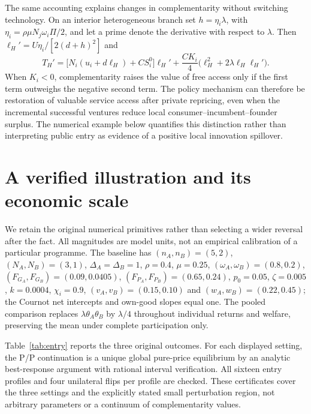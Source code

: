 \documentclass[11pt]{article}
\begin{document}
The same accounting explains changes in complementarity without switching technology.
On an interior heterogeneous branch set $h=\eta_i\lambda$, with $\eta_i=\rho\mu N_j\omega_i\Pi/2$, and let a prime denote the derivative with respect to $\lambda$.
Then $\ell_H'=U\eta_i/[2(d+h)^2]$ and
\begin{equation}
 T_H'=\big[N_i(u_i+d\ell_H)+CS_i^0\big]\ell_H'
       +\frac{CK_i}{4}\big(\ell_H^2+2\lambda\ell_H\ell_H'\big).
 \label{eq:diagnostic-derivative}
\end{equation}
When $K_i<0$, complementarity raises the value of free access only if the first term outweighs the negative second term.
The policy mechanism can therefore be restoration of valuable service access after private repricing, even when the incremental successful ventures reduce local consumer--incumbent--founder surplus.
The numerical example below quantifies this distinction rather than interpreting public entry as evidence of a positive local innovation spillover.

\section{A verified illustration and its economic scale}\label{sec:numerical}

We retain the original numerical primitives rather than selecting a wider reversal after the fact.
All magnitudes are model units, not an empirical calibration of a particular programme.
The baseline has $(n_A,n_B)=(5,2)$, $(N_A,N_B)=(3,1)$, $\Delta_A=\Delta_B=1$, $\rho=0.4$, $\mu=0.25$, $(\omega_A,\omega_B)=(0.8,0.2)$, $(F_{G_A},F_{G_B})=(0.09,0.0405)$, $(F_{P_A},F_{P_B})=(0.65,0.24)$, $p_0=0.05$, $\zeta=0.005$, $k=0.0004$, $\chi_i=0.9$, $(v_A,v_B)=(0.15,0.10)$ and $(w_A,w_B)=(0.22,0.45)$; the Cournot net intercepts and own-good slopes equal one.
The pooled comparison replaces $\lambda\theta_A\theta_B$ by $\lambda/4$ throughout individual returns and welfare, preserving the mean under complete participation only.

Table~\ref{tab:entry} reports the three original outcomes.
For each displayed setting, the P/P continuation is a unique global pure-price equilibrium by an analytic best-response argument with rational interval verification.
All sixteen entry profiles and four unilateral flips per profile are checked.
These certificates cover the three settings and the explicitly stated small perturbation region, not arbitrary parameters or a continuum of complementarity values.
\end{document}
